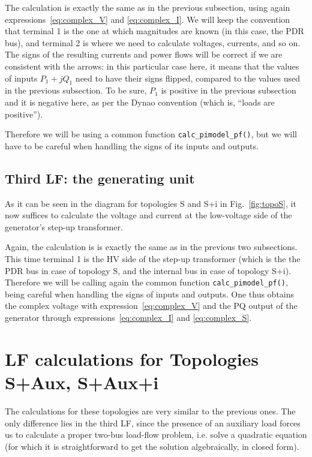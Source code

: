 \documentclass[a4paper,11pt]{article}
\newcommand{\code}[1]{\texttt{#1}}  %
\newcommand{\Dynawo}{Dyna\textomega o} %
\begin{document}
The calculation is exactly the same as in the previous subsection, using again
expressions~\eqref{eq:complex_V} and \eqref{eq:complex_I}.  We will keep the convention
that terminal 1 is the one at which magnitudes are known (in this case, the PDR bus),
and terminal 2 is where we need to calculate voltages, currents, and so on.  The signs
of the resulting currents and power flows will be correct if we are consistent with the
arrows: in this particular case here, it means that the values of inputs $P_1 + j Q_1$
need to have their signs flipped, compared to the values used in the previous
subsection.  To be sure, $P_1$ is positive in the previous subsection and it is negative
here, as per the \Dynawo{} convention (which is, ``loads are positive'').

Therefore we will be using a common function \code{calc\_pimodel\_pf()}, but we
will have to be careful when handling the signs of its inputs and outputs.


\subsection{Third LF: the generating unit}

As it can be seen in the diagram for topologies S and S+i in Fig.~\ref{fig:topoS}, it
now suffices to calculate the voltage and current at the low-voltage side of the
generator's step-up transformer.

Again, the calculation is is exactly the same as in the previous two subsections.  This
time terminal 1 is the HV side of the step-up transformer (which is the the PDR bus in
case of topology S, and the internal bus in case of topology S+i).  Therefore we will be
calling again the common function \code{calc\_pimodel\_pf()}, being careful when
handling the signs of inputs and outputs. One thus obtains the complex voltage with
expression~\eqref{eq:complex_V} and the PQ output of the generator through
expressions~\eqref{eq:complex_I} and \eqref{eq:complex_S}.




\section{LF calculations for Topologies S+Aux, S+Aux+i}

The calculations for these topologies are very similar to the previous ones.  The only
difference lies in the third LF, since the presence of an auxiliary load forces us to
calculate a proper two-bus load-flow problem, i.e. solve a quadratic equation (for which
it is straightforward to get the solution algebraically, in closed form).
\end{document}
